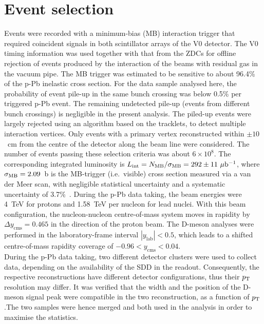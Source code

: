 \section{Event selection}
\label{sec:EvSelpPb}
Events were recorded with a minimum-bias (MB) interaction trigger 
that required coincident signals in both scintillator arrays of the V0 detector.
The V0 timing information was used together with that from the ZDCs for offline rejection 
of events produced by the interaction of the beams with residual gas in the vacuum pipe.
The MB trigger was estimated to be sensitive to about 96.4\% of the p-Pb inelastic cross section.
For the data sample analysed here, the probability of event pile-up in the 
same bunch crossing was below 0.5\% per triggered p-Pb event.
The remaining undetected pile-up (events from different bunch crossings) 
is negligible in the present analysis.
The piled-up events were largely rejected using an algorithm based on the tracklets,
to detect multiple interaction vertices.
Only events with a primary vertex reconstructed within $\pm 10$~cm from the 
centre of the detector along the beam line were considered. 
The number of events passing these selection criteria was about $6\times 10^8$.
The corresponding integrated luminosity is 
$L_{\rm int} =N_{\rm MB}/\sigma_{\rm MB}=292 \pm 11~\mu{\rm b}^{-1}$,
where $\sigma_{\rm MB}=2.09$~b is the MB-trigger (i.e.\ visible) cross section  
measured via a van der Meer scan, with negligible statistical uncertainty 
and a systematic uncertainty of 3.7\%~\cite{Abelev:2014epa}.
During the p-Pb data taking, the beam energies were 4~TeV for 
protons and 1.58~TeV per nucleon for lead nuclei. 
With this beam configuration, the nucleon-nucleon centre-of-mass system 
moves in rapidity by $\Delta y_{\mathrm{cms}}=0.465$ in the direction 
of the proton beam. The D-meson analyses were performed in 
the laboratory-frame interval $|y_{\mathrm{lab}}|<0.5$, 
which leads to a shifted centre-of-mass rapidity coverage 
of $-0.96 < y_{\mathrm{cms}} < 0.04$.\\


During the p-Pb data taking, two different detector clusters were used to collect data, depending on the 
availability of the SDD in the readout. Consequently, the respective reconstructions have different
detector configurations, thus their $p_{\rm T}$ resolution may differ. It was verified that the 
width and the position of the D-meson signal peak were compatible in the two
reconstruction, as a function of $p_{\rm T}$.The two samples were hence merged and both
used in the analysis in order to maximise the statistics.

